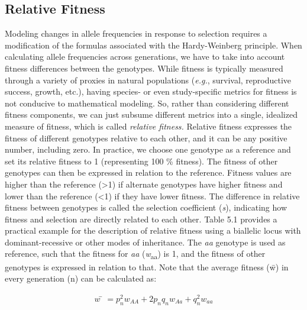 \documentclass[
]{book}
\begin{document}
\hypertarget{relative-fitness}{%
\subsection{Relative Fitness}\label{relative-fitness}}

Modeling changes in allele frequencies in response to selection requires a modification of the formulas associated with the Hardy-Weinberg principle. When calculating allele frequencies across generations, we have to take into account fitness differences between the genotypes. While fitness is typically measured through a variety of proxies in natural populations (\emph{e.g.}, survival, reproductive success, growth, etc.), having species- or even study-specific metrics for fitness is not conducive to mathematical modeling. So, rather than considering different fitness components, we can just subsume different metrics into a single, idealized measure of fitness, which is called \emph{relative fitness.} Relative fitness expresses the fitness of different genotypes relative to each other, and it can be any positive number, including zero. In practice, we choose one genotype as a reference and set its relative fitness to 1 (representing 100 \% fitness). The fitness of other genotypes can then be expressed in relation to the reference. Fitness values are higher than the reference (\textgreater1) if alternate genotypes have higher fitness and lower than the reference (\textless1) if they have lower fitness. The difference in relative fitness between genotypes is called the selection coefficient (\emph{s}), indicating how fitness and selection are directly related to each other. Table 5.1 provides a practical example for the description of relative fitness using a biallelic locus with dominant-recessive or other modes of inheritance. The \emph{aa} genotype is used as reference, such that the fitness for \emph{aa} (\emph{w}\textsubscript{aa}) is 1, and the fitness of other genotypes is expressed in relation to that. Note that the average fitness (w̄) in every generation (n) can be calculated as:

\begin{align} 
w̄=p_n^2w_{AA}+2p_nq_nw_{Aa}+q_n^2w_{aa} \label{eq:8}
\end{align}
\end{document}
